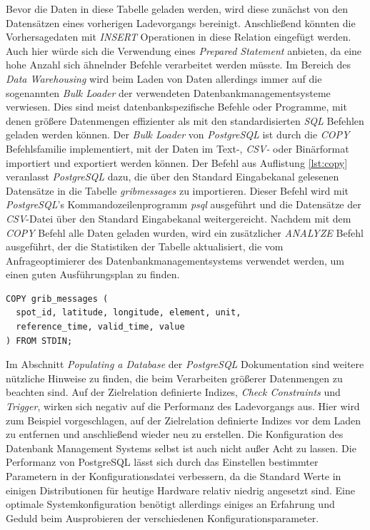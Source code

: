 Bevor die Daten in diese Tabelle geladen werden, wird diese zunächst
von den Datensätzen eines vorherigen Ladevorgangs
bereinigt. Anschließend könnten die Vorhersagedaten mit
\textit{INSERT} Operationen in diese Relation eingefügt werden. Auch
hier würde sich die Verwendung eines \textit{Prepared Statement}
anbieten, da eine hohe Anzahl sich ähnelnder Befehle verarbeitet
werden müsste. Im Bereich des \textit{Data Warehousing} wird beim
Laden von Daten allerdings immer auf die sogenannten \textit{Bulk
  Loader} der verwendeten Datenbankmanagementsysteme verwiesen. Dies
sind meist datenbankspezifische Befehle oder Programme, mit denen
größere Datenmengen effizienter als mit den standardisierten
\textit{SQL} Befehlen geladen werden können. Der \textit{Bulk Loader}
von \textit{PostgreSQL} ist durch die \textit{COPY} Befehlsfamilie
implementiert, mit der Daten im Text-, \textit{CSV-} oder Binärformat
importiert und exportiert werden können. Der Befehl aus Auflistung
\ref{lst:copy} veranlasst \textit{PostgreSQL} dazu, die über den
Standard Eingabekanal gelesenen Datensätze in die Tabelle
\textit{grib\textunderscore messages} zu importieren. Dieser Befehl
wird mit \textit{PostgreSQL}'s Kommandozeilenprogramm \textit{psql}
ausgeführt und die Datensätze der \textit{CSV}-Datei über den Standard
Eingabekanal weitergereicht. Nachdem mit dem \textit{COPY} Befehl alle
Daten geladen wurden, wird ein zusätzlicher \textit{ANALYZE} Befehl
ausgeführt, der die Statistiken der Tabelle aktualisiert, die vom
Anfrageoptimierer des Datenbankmanagementsystems verwendet werden,
um einen guten Ausführungsplan zu finden.

\begin{lstlisting}[captionpos=b, caption=Befehl zum Import von Datensätzen in \textit{PostgreSQL}, label=lst:copy]
COPY grib_messages (
  spot_id, latitude, longitude, element, unit, 
  reference_time, valid_time, value
) FROM STDIN;
\end{lstlisting}

Im Abschnitt \textit{Populating a Database} \cite{postgresql:populate}
der \textit{PostgreSQL} Dokumentation sind weitere nützliche Hinweise
zu finden, die beim Verarbeiten größerer Datenmengen zu beachten
sind. Auf der Zielrelation definierte Indizes, \textit{Check
  Constraints} und \textit{Trigger}, wirken sich negativ auf die
Performanz des Ladevorgangs aus. Hier wird zum Beispiel vorgeschlagen,
auf der Zielrelation definierte Indizes vor dem Laden zu entfernen und
anschließend wieder neu zu erstellen. Die Konfiguration des Datenbank
Management Systems selbst ist auch nicht außer Acht zu lassen. Die
Performanz von PostgreSQL lässt sich durch das Einstellen bestimmter
Parametern in der Konfigurationsdatei verbessern, da die Standard
Werte in einigen Distributionen für heutige Hardware relativ niedrig
angesetzt sind. Eine optimale Systemkonfiguration benötigt allerdings
einiges an Erfahrung und Geduld beim Ausprobieren der verschiedenen
Konfigurationsparameter.

